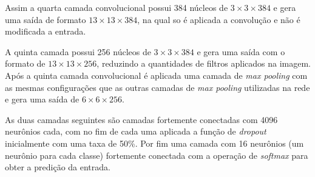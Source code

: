 \par Assim a quarta camada convolucional possui 384 núcleos de $3\times3\times384$ e gera uma saída de formato $13\times13\times384$, na qual so é aplicada a convolução e não é modificada a entrada.

\par A quinta camada possui 256 núcleos de $3\times3\times384$ e gera uma saída com o formato de $13\times13\times256$, reduzindo a quantidades de filtros aplicados na imagem. Após a quinta camada convolucional é aplicada uma camada de \textit{max pooling} com as mesmas configurações que as outras camadas de \textit{max pooling} utilizadas na rede e gera uma saída de $6\times6\times256$.

\par As duas camadas seguintes são camadas fortemente conectadas com 4096 neurônios cada, com no fim de cada uma aplicada a função de \textit{dropout} inicialmente com uma taxa de 50\%. Por fim uma camada com 16 neurônios (um neurônio para cada classe) fortemente conectada com a operação de \textit{softmax} para obter a predição da entrada.

